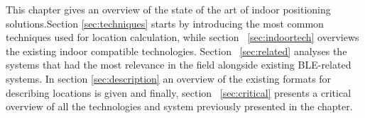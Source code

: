 \label{cap:indoor}

This chapter gives an overview of the state of the art of indoor positioning solutions.Section \ref{sec:techniques} starts by introducing the most common techniques used for location calculation, while section ~\ref{sec:indoortech} overviews the existing indoor compatible technologies. Section ~\ref{sec:related} analyses the systems that had the most relevance in the field alongside existing \ac{BLE}-related systems. In section \ref{sec:description} an overview of the existing formats for describing locations is given and finally, section ~\ref{sec:critical} presents a critical overview of all the technologies and system previously presented in the chapter.






\cleardoublepage
